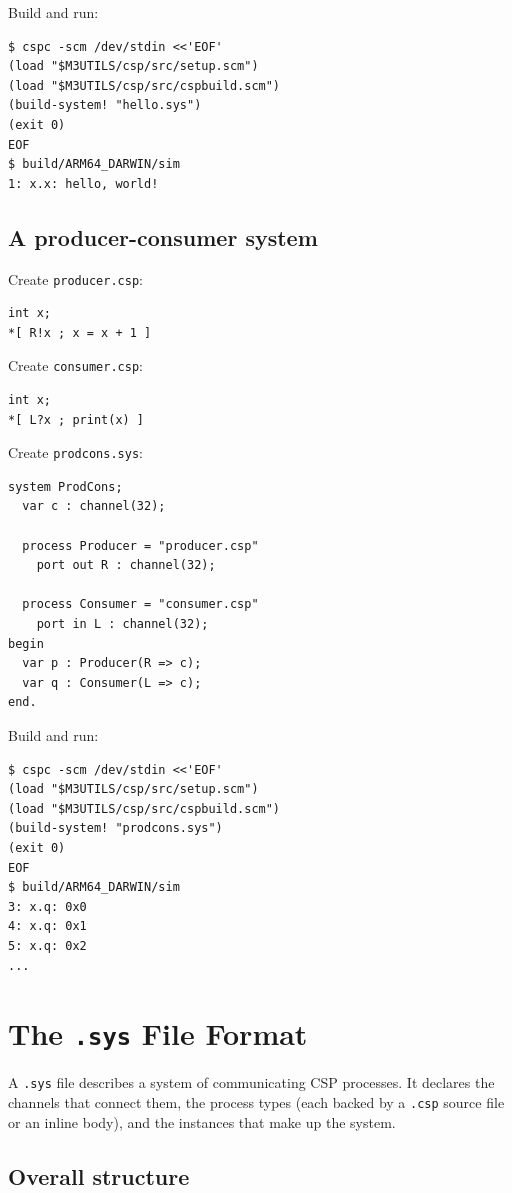 \documentclass[11pt]{article}
\begin{document}
Build and run:
\begin{Verbatim}[samepage=true]
$ cspc -scm /dev/stdin <<'EOF'
(load "$M3UTILS/csp/src/setup.scm")
(load "$M3UTILS/csp/src/cspbuild.scm")
(build-system! "hello.sys")
(exit 0)
EOF
$ build/ARM64_DARWIN/sim
1: x.x: hello, world!
\end{Verbatim}

\subsection{A producer-consumer system}

Create \texttt{producer.csp}:
\begin{Verbatim}[samepage=true]
int x;
*[ R!x ; x = x + 1 ]
\end{Verbatim}

Create \texttt{consumer.csp}:
\begin{Verbatim}[samepage=true]
int x;
*[ L?x ; print(x) ]
\end{Verbatim}

Create \texttt{prodcons.sys}:
\begin{Verbatim}[samepage=true]
system ProdCons;
  var c : channel(32);

  process Producer = "producer.csp"
    port out R : channel(32);

  process Consumer = "consumer.csp"
    port in L : channel(32);
begin
  var p : Producer(R => c);
  var q : Consumer(L => c);
end.
\end{Verbatim}

Build and run:
\begin{Verbatim}[samepage=true]
$ cspc -scm /dev/stdin <<'EOF'
(load "$M3UTILS/csp/src/setup.scm")
(load "$M3UTILS/csp/src/cspbuild.scm")
(build-system! "prodcons.sys")
(exit 0)
EOF
$ build/ARM64_DARWIN/sim
3: x.q: 0x0
4: x.q: 0x1
5: x.q: 0x2
...
\end{Verbatim}

\section{The \texttt{.sys} File Format}

A \texttt{.sys} file describes a system of communicating CSP processes.
It declares the channels that connect them, the process types (each
backed by a \texttt{.csp} source file or an inline body), and the
instances that make up the system.

\subsection{Overall structure}
\end{document}

